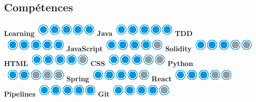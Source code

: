 \documentclass[]{friggeri-cv}
\begin{document}
\begin{aside}
  \section{Compétences}
  \hspace{1cm}
    \textbf{Learning}\includegraphics[scale=0.40]{img/5puces.png}
    \textbf{Java}\includegraphics[scale=0.40]{img/5puces.png}
    \textbf{TDD}\includegraphics[scale=0.40]{img/5puces.png}
    \textbf{JavaScript}\includegraphics[scale=0.40]{img/4puces.png}
    \textbf{Solidity}\includegraphics[scale=0.40]{img/3puces.png}
    \textbf{HTML}\includegraphics[scale=0.40]{img/4puces.png}
    \textbf{CSS}\includegraphics[scale=0.40]{img/3puces.png}
    \textbf{Python}\includegraphics[scale=0.40]{img/2puces.png}
    \textbf{Spring}\includegraphics[scale=0.40]{img/4puces.png}
    \textbf{React}\includegraphics[scale=0.40]{img/3puces.png}
    \textbf{Pipelines}\includegraphics[scale=0.40]{img/5puces.png}
    \textbf{Git}\includegraphics[scale=0.40]{img/4puces.png}

\end{aside}
\end{document}
